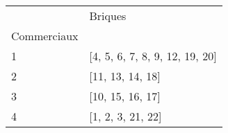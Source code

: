 \documentclass[preview]{standalone}
\begin{document}
    \begin{tabular}{ll}
\toprule
 & Briques \\
Commerciaux &  \\
\midrule
1 & [4, 5, 6, 7, 8, 9, 12, 19, 20] \\
2 & [11, 13, 14, 18] \\
3 & [10, 15, 16, 17] \\
4 & [1, 2, 3, 21, 22] \\
\bottomrule
\end{tabular}

    
\end{document}
